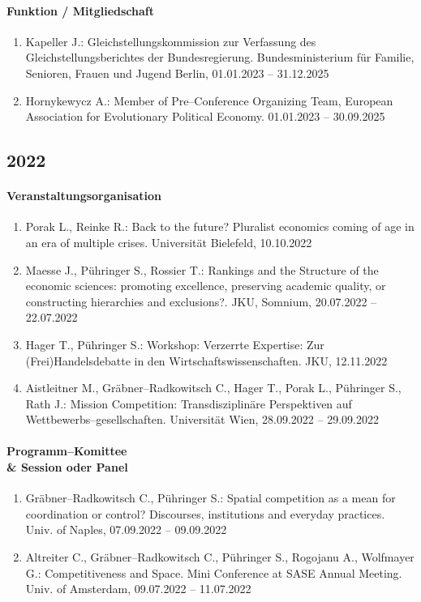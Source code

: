 \paragraph{Funktion / Mitgliedschaft}
\begin{enumerate}[leftmargin=*, labelsep=0.5cm]
\item Kapeller J.: Gleichstellungskommission zur Verfassung des Gleichstellungsberichtes der Bundesregierung. Bundesministerium für Familie, Senioren, Frauen und Jugend Berlin, 01.01.2023 -- 31.12.2025
\item Hornykewycz A.: Member of Pre--Conference Organizing Team, European Association for Evolutionary Political Economy. 01.01.2023 -- 30.09.2025
\end{enumerate}
\subsection*{2022}
\paragraph{Veranstaltungsorganisation}
\begin{enumerate}[leftmargin=*, labelsep=0.5cm]
\item Porak L., Reinke R.: Back to the future? Pluralist economics coming of age in an era of multiple crises. Universität Bielefeld, 10.10.2022
\item Maesse J., Pühringer S., Rossier T.: Rankings and the Structure of the economic sciences: promoting excellence, preserving academic quality, or constructing hierarchies and exclusions?. JKU, Somnium, 20.07.2022 -- 22.07.2022
\item Hager T., Pühringer S.: Workshop: Verzerrte Expertise: Zur (Frei)Handelsdebatte in den Wirtschaftswissenschaften. JKU, 12.11.2022
\item Aistleitner M., Gräbner--Radkowitsch C., Hager T., Porak L., Pühringer S., Rath J.: Mission Competition: Transdisziplinäre Perspektiven auf Wettbewerbs--gesellschaften. Universität Wien, 28.09.2022 -- 29.09.2022
\end{enumerate}

\paragraph{Programm--Komittee \\\& Session oder Panel}
\begin{enumerate}[leftmargin=*, labelsep=0.5cm]
\item Gräbner--Radkowitsch C., Pühringer S.: Spatial competition as a mean for coordination or control? Discourses, institutions and everyday practices. Univ. of Naples, 07.09.2022 -- 09.09.2022
\item Altreiter C., Gräbner--Radkowitsch C., Pühringer S., Rogojanu A., Wolfmayer G.: Competitiveness and Space. Mini Conference at SASE Annual Meeting. Univ. of Amsterdam, 09.07.2022 -- 11.07.2022
\end{enumerate}

